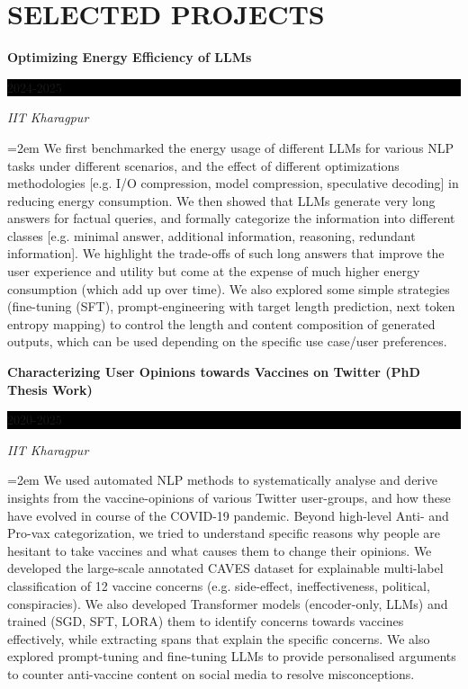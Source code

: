 \documentclass[paper=a4,fontsize=10pt]{scrartcl} %
\newcommand{\sepspace}{\vspace*{0.6em}}		%
\newcommand{\NewPart}[1]{\section*{\uppercase{#1}}}
\newcommand{\EducationEntry}[4]{
		\noindent \textbf{#1} \hfill      %
		\colorbox{Black}{%
			\parbox{6em}{%
			\hfill\color{White}#2}} \par  %
		\noindent \textit{#3} \par        %
		\noindent\hangindent=2em\hangafter=0 \small #4 %
		\normalsize \par}
\begin{document}
\NewPart{Selected Projects}
\vspace*{-1mm}
{ \small

\EducationEntry{Optimizing Energy Efficiency of LLMs}{2024-2025}{IIT Kharagpur}{We first benchmarked the energy usage of different LLMs for various NLP tasks under different scenarios, and the effect of different optimizations methodologies [e.g. I/O compression, model compression, speculative decoding] in reducing energy consumption. 
We then showed that LLMs generate very long answers for factual queries, and formally categorize the information into different classes [e.g. minimal answer, additional information, reasoning, redundant information]. We highlight the trade-offs of such long answers that improve the user experience and utility but come at the expense of much higher energy consumption (which add up over time). We also explored some simple strategies (fine-tuning (SFT), prompt-engineering with target length prediction, next token entropy mapping) to control the length and content composition of generated outputs, which can be used depending on the specific use case/user preferences.  
}
\sepspace

\EducationEntry{Characterizing User Opinions towards Vaccines on Twitter (PhD Thesis Work)}{2020-2025}{IIT Kharagpur}{We used automated NLP methods to systematically analyse and derive insights from the vaccine-opinions of various Twitter user-groups, and how these have evolved in course of the COVID-19 pandemic. 
Beyond high-level Anti- and Pro-vax categorization, we tried to understand specific reasons why people are hesitant to take vaccines and what causes them to change their opinions. We developed the large-scale annotated CAVES dataset for explainable multi-label classification of 12 vaccine concerns (e.g. side-effect, ineffectiveness, political, conspiracies). 
We also developed Transformer models (encoder-only, LLMs) and trained (SGD, SFT, LORA) them to identify concerns towards vaccines effectively, while extracting spans that explain the specific concerns. 
We also explored prompt-tuning and fine-tuning LLMs to provide personalised arguments to counter anti-vaccine content on social media to resolve misconceptions.}
\sepspace


}
\end{document}
